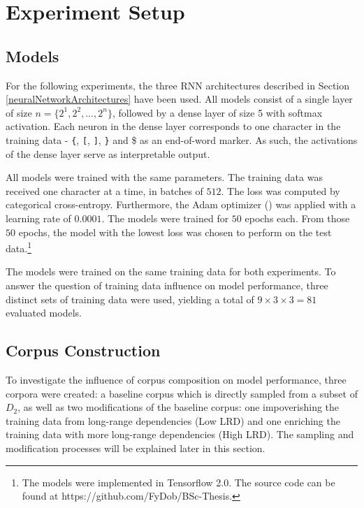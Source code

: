 \section{Experiment Setup}\label{experimentSetup}

\subsection{Models}\label{models}
For the following experiments, the three RNN architectures described in Section \ref{neuralNetworkArchitectures} have been used. All models consist of a single layer of size $n = \lbrace 2^{1}, 2^{2}, \dots, 2^{n} \rbrace$, followed by a dense layer of size 5 with softmax activation. Each neuron in the dense layer corresponds to one character in the training data - \texttt{\{}, \texttt{[}, \texttt{]}, \texttt{\}} and \$ as an end-of-word marker. As such, the activations of the dense layer serve as interpretable output.

All models were trained with the same parameters. The training data was received one character at a time, in batches of $512$. The loss was computed by categorical cross-entropy. Furthermore, the Adam optimizer (\cite{Kingma2014}) was applied with a learning rate of $0.0001$. The models were trained for $50$ epochs each. From those $50$ epochs, the model with the lowest loss was chosen to perform on the test data.\footnote{The models were implemented in Tensorflow 2.0. The source code can be found at https://github.com/FyDob/BSc-Thesis.}

The models were trained on the same training data for both experiments. To answer the question of training data influence on model performance, three distinct sets of training data were used, yielding a total of $9 \times 3 \times 3 = 81$ evaluated models.

\subsection{Corpus Construction}\label{corpusConstruction}
To investigate the influence of corpus composition on model performance, three corpora were created: a baseline corpus which is directly sampled from a subset of $D_{2}$, as well as two modifications of the baseline corpus: one impoverishing the training data from long-range dependencies (Low LRD) and one enriching the training data with more long-range dependencies (High LRD). The sampling and modification processes will be explained later in this section.

